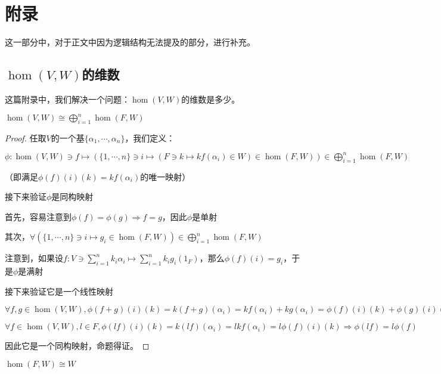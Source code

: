 \documentclass[12pt, a4paper, oneside, UTF8]{ctexbook}
\begin{document}
	\else
	\fi
	\chapter{附录}
	这一部分中，对于正文中因为逻辑结构无法提及的部分，进行补充。
		\section{$\hom(V,W)$的维数}
			这篇附录中，我们解决一个问题：$\hom(V,W)$的维数是多少。
			\begin{lemma}{}{}
				$\hom(V,W) \cong \bigoplus_{i=1}^{n} \hom(F,W)$
			\end{lemma}
			\begin{proof}
				任取$V$的一个基$\{\alpha_1,\cdots,\alpha_n\}$，我们定义：

				$\phi : \hom(V,W) \ni f \mapsto \left(\{1,\cdots,n\} \ni i \mapsto \left(F \ni k \mapsto kf(\alpha_i) \in W\right) \in \hom(F,W)\right) \in \bigoplus_{i=1}^{n} \hom(F,W)$
					
				（即满足$\phi (f)(i)(k)=kf(\alpha_i)$的唯一映射）
						
				接下来验证$\phi $是同构映射

				首先，容易注意到$\phi (f)=\phi (g) \Rightarrow f=g$，因此$\phi $是单射

				其次，$\forall \left(\{1,\cdots,n\} \ni i \mapsto g_i \in \hom(F,W)\right) \in \bigoplus_{i=1}^{n} \hom(F,W)$

				注意到，如果设$f:V \ni \sum\limits_{i=1}^{n} k_i \alpha_i \mapsto \sum\limits_{i=1}^{n} k_i g_i(1_F)$，那么$\phi (f)(i)=g_i$，于是$\phi $是满射

				接下来验证它是一个线性映射

				$\forall f,g \in \hom(V,W),\phi (f+g)(i)(k)=k(f+g)(\alpha_i)=kf(\alpha_i)+kg(\alpha_i)=\phi (f)(i)(k)+\phi (g)(i)(k) \Rightarrow \phi (f+g)=\phi (f)+\phi (g)$

				$\forall f \in \hom(V,W),l \in F,\phi (lf)(i)(k)=k(lf)(\alpha_i)=lkf(\alpha_i)=l\phi (f)(i)(k) \Rightarrow \phi (lf)=l\phi (f)$

				因此它是一个同构映射，命题得证。
			\end{proof}
			\begin{lemma}{}{}
				$\hom(F,W) \cong W$
			\end{lemma}
\end{document}
